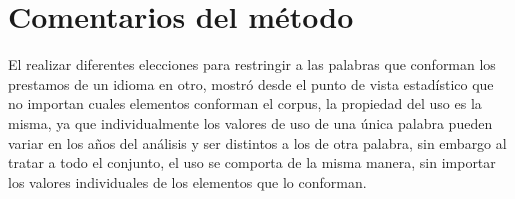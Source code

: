 \section{Comentarios del método}

El realizar diferentes elecciones para restringir a las palabras que conforman los prestamos de un idioma en otro, mostró desde el punto de vista estadístico que no importan cuales elementos conforman el corpus, la propiedad del uso es la misma, ya que individualmente los valores de uso de una única palabra pueden variar en los años del análisis y ser distintos a los de otra palabra, sin embargo al tratar a todo el conjunto, el uso se comporta de la misma  manera, sin importar los valores individuales de los elementos que lo conforman. 







